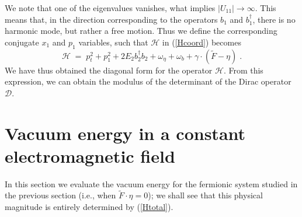 \documentclass[a4paper,12pt]{article}
\newcommand{\Fd}{\widetilde{F}}
\newcommand{\n}{\eta}
\newcommand{\w}{\omega}
\begin{document}
We note that one of the eigenvalues vanishes, what implies
$|U_{11}|\to\infty$. This means that, in the direction corresponding to the
operators $b_1$ and $b_1^\dagger$, there is no harmonic mode, but rather a
free motion. Thus we define the corresponding conjugate $x_1$ and
$p_1$ variables, such that ${\mathcal H}$ in (\ref{Hcoord}) becomes
\begin{equation}\label{Hdiag}
{\mathcal H}\;=\; p_t^2 + p_1^2 + 2 E_2 b_2^\dagger b_2 + \w_\n + \w_b + \gamma \cdot (\Fd-\n)\;.
\end{equation}
We have thus obtained the diagonal form for the operator
$\mathcal{H}$.  From this expression, we can obtain the modulus of the
determinant of the Dirac operator ${\mathcal D}$.
\section{Vacuum energy in a constant electromagnetic 
  field}\label{sec:vacuum}
In this section we evaluate the vacuum energy for the fermionic
system studied in the previous section (i.e., when $\Fd \cdot \n =0$); we shall 
see that this physical magnitude is entirely determined by
(\ref{Htotal}). 
\end{document}
